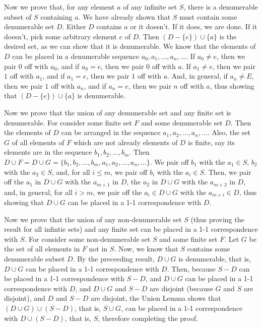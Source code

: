 \documentclass{article}
\theoremstyle{definition}
\begin{document}
Now we prove that, for any element $a$ of any infinite set $S$, there is a denumerable subset of $S$ containing $a$. We have already shown that $S$ must contain some
denumerable set $D$. Either $D$ contains $a$ or it doesn't. If it does, we are done. If it doesn't, pick some arbitrary element $e$ of $D$. Then $(D-\{e\})\cup\{a\}$ is the desired set, as we can
show that it is denumerable. We know that the elements of $D$ can be placed in a denumerable sequence $a_0,a_1,...,a_n,...$. If $a_0\ne e$, then we pair $0$ off with $a_0$, and if
$a_0=e$, then we pair $0$ off with $a$. If
$a_1\ne e$, then we pair $1$ off with $a_1$, and if $a_1=e$, then we pair $1$ off with $a$. And, in general, if $a_n\ne E$, then we pair $1$ off with $a_n$, and if
$a_n=e$, then we pair $n$ off with $a$, thus showing that $(D-\{e\})\cup\{a\}$ is denumerable.


Now we prove that the union of any denumerable set and any finite set is denumerable. For consider some finite set $F$ and some denumerable set $D$. Then the elements of $D$ can be 
arranged in the sequence $a_1,a_2,...,a_n,...$. Also, the set $G$ of all elements of $F$ which are not already elements of $D$ is finite, say its elements are in the sequence 
$b_1,b_2,...,b_m$. Then $D\cup F=D\cup G=\{b_1,b_2,...,b_m,a_1,a_2,...,a_n,...\}$. We pair off $b_1$ with the $a_1\in S$, $b_2$ with the $a_2\in S$, and, for all $i\le m$, 
we pair off $b_i$ with the $a_i\in S$. Then, we pair off the $a_1$ in $D\cup G$ with the $a_{m+1}$ in $D$, the $a_2$ in $D\cup G$ with the $a_{m+2}$ in $D$, and, in general, for all 
$i>m$, we pair off the $a_i\in D\cup G$ with the $a_{m+i}\in D$, thus showing that $D\cup G$ can be placed in a 1-1 correspondence with $D$.


Now we prove that the union of any non-denumerable set $S$ (thus proving the result for all infintie sets) and any finite set can be placed in a 1-1 correspondence with $S$. For consider 
some non-denumerable set $S$ and some finite set $F$. Let $G$ be the set of all elements in $F$ not in $S$. Now, we know that $S$ contains some denumerable subset $D$. By the preceeding result, 
$D\cup G$ is denumerable, that is, $D\cup G$ can be placed in a 1-1 correspondence with $D$. Then, because $S-D$ can be placed in a 1-1 correspondence with $S-D$, and 
$D\cup G$ can be placed in a 1-1 correspondence with $D$, and $D\cup G$ and $S-D$ are disjoint (because $G$ and $S$ are disjoint), and $D$ and $S-D$ are disjoint, the Union Lemma shows that 
$(D\cup G)\cup (S-D)$, that is, $S\cup G$, can be placed in a 1-1 correspondence 
with $D\cup (S-D)$, that is, $S$, therefore completing the proof.
\end{document}
